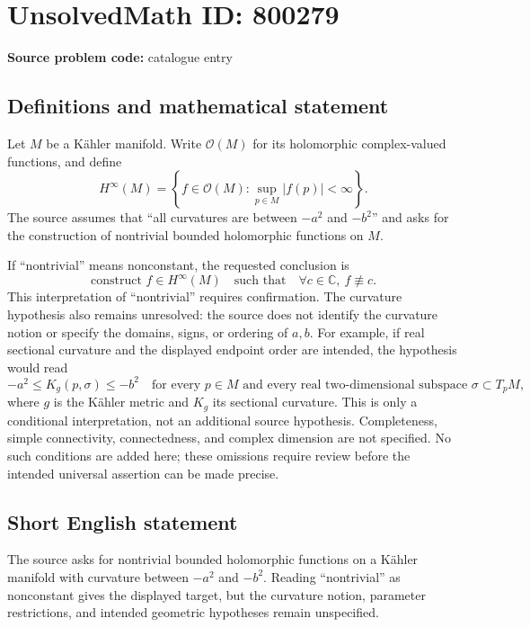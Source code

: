 \documentclass[11pt]{article}
\newcommand{\C}{\mathbb{C}}
\begin{document}
\section*{UnsolvedMath ID: 800279}
\textbf{Source problem code:} catalogue entry
\subsection{Definitions and mathematical statement}
Let \(M\) be a K\"ahler manifold. Write \(\mathcal O(M)\) for its holomorphic complex-valued functions, and define
\[
H^\infty(M)=\left\{f\in\mathcal O(M):\sup_{p\in M}|f(p)|<\infty\right\}.
\]
The source assumes that ``all curvatures are between \(-a^2\) and \(-b^2\)'' and asks for the construction of nontrivial bounded holomorphic functions on \(M\).

If ``nontrivial'' means nonconstant, the requested conclusion is
\[
\text{construct }f\in H^\infty(M)\quad\text{such that}\quad
\forall c\in\C,\ f\not\equiv c.
\]
This interpretation of ``nontrivial'' requires confirmation. The curvature hypothesis also remains unresolved: the source does not identify the curvature notion or specify the domains, signs, or ordering of \(a,b\). For example, if real sectional curvature and the displayed endpoint order are intended, the hypothesis would read
\[
-a^2\le K_g(p,\sigma)\le-b^2
\quad\text{for every }p\in M\text{ and every real two-dimensional subspace }\sigma\subset T_pM,
\]
where \(g\) is the K\"ahler metric and \(K_g\) its sectional curvature. This is only a conditional interpretation, not an additional source hypothesis. Completeness, simple connectivity, connectedness, and complex dimension are not specified. No such conditions are added here; these omissions require review before the intended universal assertion can be made precise.
\subsection{Short English statement}
The source asks for nontrivial bounded holomorphic functions on a K\"ahler manifold with curvature between \(-a^2\) and \(-b^2\). Reading ``nontrivial'' as nonconstant gives the displayed target, but the curvature notion, parameter restrictions, and intended geometric hypotheses remain unspecified.
\end{document}
